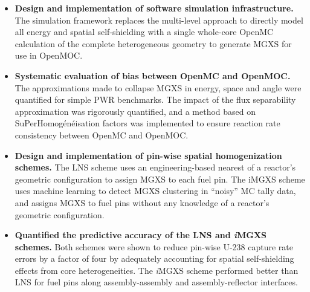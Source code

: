 \begin{itemize}

\item \textbf{Design and implementation of software simulation infrastructure.} The simulation framework replaces the multi-level approach to directly model all energy and spatial self-shielding with a single whole-core OpenMC calculation of the complete heterogeneous geometry to generate MGXS for use in OpenMOC.

\item \textbf{Systematic evaluation of bias between OpenMC and OpenMOC.} The approximations made to collapse MGXS in energy, space and angle were quantified for simple PWR benchmarks. The impact of the flux separability approximation was rigorously quantified, and a method based on SuPerHomog\'{e}n\'{e}isation factors was implemented to ensure reaction rate consistency between OpenMC and OpenMOC.

\item \textbf{Design and implementation of pin-wise spatial homogenization schemes.} The LNS scheme uses an engineering-based nearest of a reactor's geometric configuration to assign MGXS to each fuel pin. The iMGXS scheme uses machine learning to detect MGXS clustering in ``noisy'' MC tally data, and assigns MGXS to fuel pins without any knowledge of a reactor's geometric configuration.


\item \textbf{Quantified the predictive accuracy of the LNS and \textit{i}MGXS schemes.} Both schemes were shown to reduce pin-wise U-238 capture rate errors by a factor of four by adequately accounting for spatial self-shielding effects from core heterogeneities. The \textit{i}MGXS scheme performed better than LNS for fuel pins along assembly-assembly and assembly-reflector interfaces. 




\end{itemize}
